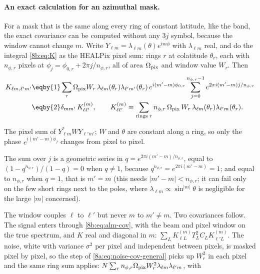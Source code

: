 \paragraph{An exact calculation for an azimuthal mask.}
For a mask that is the same along every ring of constant latitude, like the band, the exact
covariance can be computed without any $3j$ symbol, because the window cannot change $m$. Write
$Y_{\ell m}=\lambda_{\ell m}(\theta)e^{im\phi}$ with $\lambda_{\ell m}$ real, and do the integral \eqref{8b:eq:K} as the HEALPix pixel
sum: rings $r$ at colatitude $\theta_r$, each with $n_{\phi,r}$ pixels at $\phi_j=\phi_{0,r}+2\pi j/n_{\phi,r}$, all of area
$\Omega_{\rm pix}$ and window value $W_r$. Then
\begin{align}
  K_{\ell m,\ell'm'}
  &\eqby{1}\sum_r\Omega_{\rm pix}W_r\,\lambda_{\ell m}(\theta_r)\lambda_{\ell'm'}(\theta_r)\,e^{i(m'-m)\phi_{0,r}}
     \sum_{j=0}^{n_{\phi,r}-1}e^{2\pi i(m'-m)j/n_{\phi,r}}
   \nonumber\\
  &\eqby{2}\delta_{mm'}\,K^{(m)}_{\ell\ell'},\qquad
  K^{(m)}_{\ell\ell'}\equiv\sum_{\text{rings }r}n_{\phi,r}\,\Omega_{\rm pix}\,W_r\,\lambda_{\ell m}(\theta_r)\lambda_{\ell'm}(\theta_r) .
  \label{8b:eq:K-ring}
\end{align}
\begin{explain}
  \item The pixel sum of $Y^*_{\ell m}WY_{\ell'm'}$; $W$ and $\theta$ are constant along a ring, so only the phase
        $e^{i(m'-m)\phi_j}$ changes from pixel to pixel.
  \item The sum over $j$ is a geometric series in $q=e^{2\pi i(m'-m)/n_{\phi,r}}$, equal to $(1-q^{n_{\phi,r}})/(1-q)=0$ when
        $q\neq1$, because $q^{n_{\phi,r}}=e^{2\pi i(m'-m)}=1$; and equal to $n_{\phi,r}$ when $q=1$, that is $m'=m$ (this needs
        $|m'-m|<n_{\phi,r}$; it can fail only on the few short rings next to the poles, where $\lambda_{\ell m}\propto\sin^{|m|}\theta$
        is negligible for the large $|m|$ concerned).
\end{explain}
The window couples $\ell$ to $\ell'$ but never $m$ to $m'\neq m$. Two covariances follow. The signal enters
through \eqref{8b:eq:alm-cov}, with the beam and pixel window on the true spectrum, and $K$ real and
diagonal in $m$: $\sum_LK^{(m)}_{\ell L}T_L^2C_LK^{(m)}_{\ell'L}$. The noise, white with variance $\sigma^2$ per pixel and
independent between pixels, is masked pixel by pixel, so the step of \eqref{8a:eq:noise-cov-general} picks
up $W_r^2$ in each pixel and the same ring sum applies: $N\sum_rn_{\phi,r}\Omega_{\rm pix}W_r^2\lambda_{\ell m}\lambda_{\ell'm}$, with
